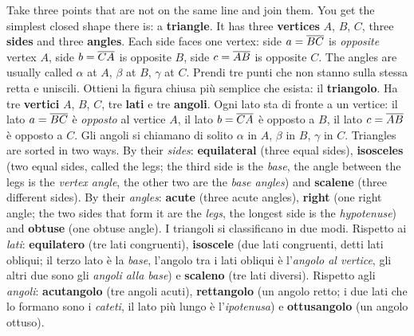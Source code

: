 \label{ch:triangles}

\label{sec:anatomy}
\begin{bi}
\colheads
Take three points that are not on the same line and join them. You get the simplest closed shape there is: a \textbf{triangle}. It has three \textbf{vertices} $A$, $B$, $C$, three \textbf{sides} and three \textbf{angles}. Each side faces one vertex: side $a = \overline{BC}$ is \emph{opposite} vertex $A$, side $b = \overline{CA}$ is opposite $B$, side $c = \overline{AB}$ is opposite $C$. The angles are usually called $\alpha$ at $A$, $\beta$ at $B$, $\gamma$ at $C$.
\IT
Prendi tre punti che non stanno sulla stessa retta e uniscili. Ottieni la figura chiusa più semplice che esista: il \textbf{triangolo}. Ha tre \textbf{vertici} $A$, $B$, $C$, tre \textbf{lati} e tre \textbf{angoli}. Ogni lato sta di fronte a un vertice: il lato $a = \overline{BC}$ è \emph{opposto} al vertice $A$, il lato $b = \overline{CA}$ è opposto a $B$, il lato $c = \overline{AB}$ è opposto a $C$. Gli angoli si chiamano di solito $\alpha$ in $A$, $\beta$ in $B$, $\gamma$ in $C$.
\EN
Triangles are sorted in two ways. By their \emph{sides}: \textbf{equilateral} (three equal sides), \textbf{isosceles} (two equal sides, called the legs; the third side is the \emph{base}, the angle between the legs is the \emph{vertex angle}, the other two are the \emph{base angles}) and \textbf{scalene} (three different sides). By their \emph{angles}: \textbf{acute} (three acute angles), \textbf{right} (one right angle; the two sides that form it are the \emph{legs}, the longest side is the \emph{hypotenuse}) and \textbf{obtuse} (one obtuse angle).
\IT
I triangoli si classificano in due modi. Rispetto ai \emph{lati}: \textbf{equilatero} (tre lati congruenti), \textbf{isoscele} (due lati congruenti, detti lati obliqui; il terzo lato è la \emph{base}, l'angolo tra i lati obliqui è l'\emph{angolo al vertice}, gli altri due sono gli \emph{angoli alla base}) e \textbf{scaleno} (tre lati diversi). Rispetto agli \emph{angoli}: \textbf{acutangolo} (tre angoli acuti), \textbf{rettangolo} (un angolo retto; i due lati che lo formano sono i \emph{cateti}, il lato più lungo è l'\emph{ipotenusa}) e \textbf{ottusangolo} (un angolo ottuso).
\end{bi}

